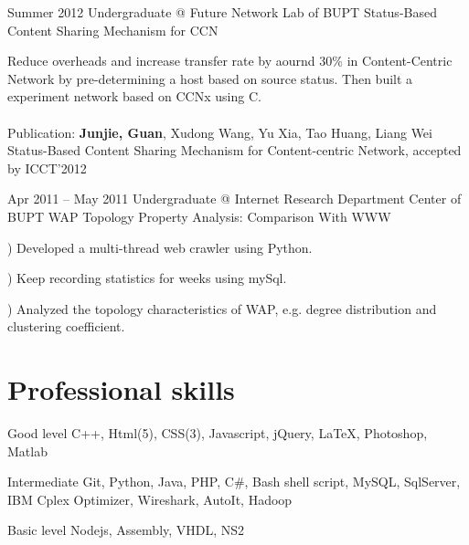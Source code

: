 \documentclass{tccv}
\begin{document}
\begin{eventlist}

\item{Summer 2012}
     {Undergraduate @ Future Network Lab of BUPT}
     {Status-Based Content Sharing Mechanism for CCN}
     
	Reduce overheads and increase transfer rate by aournd 30\% in Content-Centric Network by pre-determining a host based on source status. Then built a experiment network based on CCNx using C. 
\\\\
Publication: \textbf{Junjie, Guan}, Xudong Wang, Yu Xia, Tao Huang, Liang Wei Status-Based Content Sharing Mechanism for Content-centric Network, accepted by ICCT’2012

\item{Apr 2011 -- May 2011}
     {Undergraduate @ Internet Research Department Center of BUPT}
     {WAP Topology Property Analysis: Comparison With WWW}     
     
) Developed a multi-thread web crawler using Python. 

) Keep recording statistics for weeks using mySql. 

) Analyzed the topology characteristics of WAP, e.g. degree distribution and clustering coefficient.\newline

\end{eventlist}






















\if
\section{Professional skills}

\begin{factlist}

\item{Good level}
     {C++, Html(5), CSS(3), Javascript, jQuery, \LaTeX, Photoshop, Matlab}

\item{Intermediate}
     {Git, Python, Java, PHP, C\#, Bash shell script, MySQL, SqlServer, IBM Cplex Optimizer, Wireshark, AutoIt, Hadoop}

\item{Basic level}
     {Nodejs, Assembly, VHDL, NS2}

\end{factlist}

\fi
\end{document}
